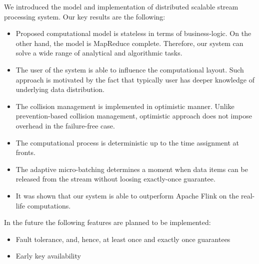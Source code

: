 
\label {fs-conclusions}

We introduced the model and implementation of distributed scalable stream processing system. Our key results are the following:

\begin{itemize}
    \item Proposed computational model is stateless in terms of business-logic. On the other hand, the model is MapReduce complete. Therefore, our system can solve a wide range of analytical and algorithmic tasks.
    \item The user of the system is able to influence the computational layout. Such approach is motivated by the fact that typically user has deeper knowledge of underlying data distribution.
    \item The collision management is implemented in optimistic manner. Unlike prevention-based collision management, optimistic approach does not impose overhead in the failure-free case.
    \item The computational process is deterministic up to the time assignment at fronts.
    \item The adaptive micro-batching determines a moment when data items can be released from the stream without loosing exactly-once guarantee.  
    \item It was shown that our system is able to outperform Apache Flink on the real-life computations.
\end{itemize}

In the future the following features are planned to be implemented:
\begin{itemize}
    \item Fault tolerance, and, hence, at least once and exactly once guarantees
    \item Early key availability
\end{itemize}

